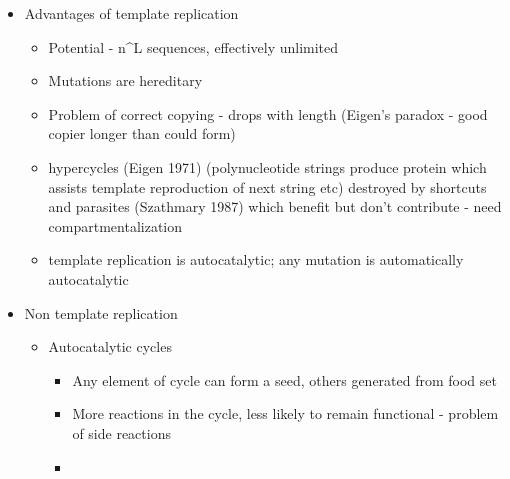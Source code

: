 		\begin{itemize}
			\item
			
			Advantages of template replication
			
			
			\begin{itemize}
				\item
				
				Potential - n\^{}L sequences, effectively unlimited
				
				\item
				
				Mutations are hereditary
				
				\item
				
				Problem of correct copying - drops with length (Eigen's paradox -
				good copier longer than could form)
				
				\item
				
				hypercycles (Eigen 1971) (polynucleotide strings produce protein
				which assists template reproduction of next string etc) destroyed by
				shortcuts and parasites (Szathmary 1987) which benefit but don't
				contribute - need compartmentalization
				
				\item
				
				template replication is autocatalytic; any mutation is automatically
				autocatalytic
				
			\end{itemize}
			\item
			
			Non template replication
			
			
			\begin{itemize}
				\item
				
				Autocatalytic cycles
				
				
				\begin{itemize}
					\item
					
					Any element of cycle can form a seed, others generated from food
					set
					
					\item
					
					More reactions in the cycle, less likely to remain functional -
					problem of side reactions
					
					\item
					

\end{itemize}
\end{itemize}
\end{itemize}
